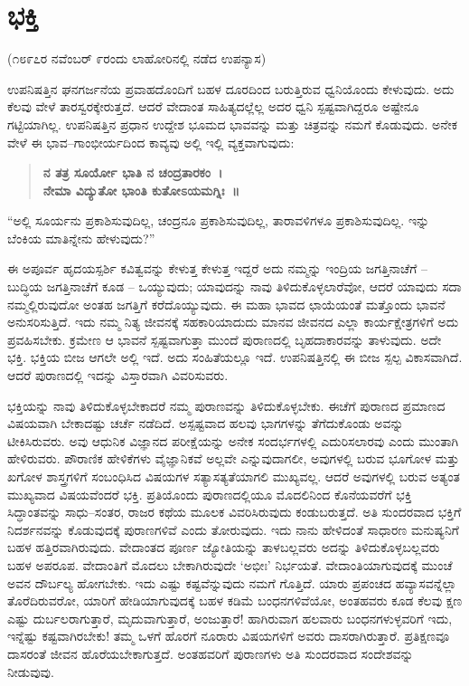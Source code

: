 
\chapter{ಭಕ್ತಿ}

\begin{center}
(೧೮೯೭ರ ನವೆಂಬರ್​ ೯ರಂದು ಲಾಹೋರಿನಲ್ಲಿ ನಡೆದ ಉಪನ್ಯಾಸ)
\end{center}

ಉಪನಿಷತ್ತಿನ ಘನಗರ್ಜನೆಯ ಪ್ರವಾಹದೊಂದಿಗೆ ಬಹಳ ದೂರದಿಂದ ಬರುತ್ತಿರುವ ಧ್ವನಿಯೊಂದು ಕೇಳುವುದು. ಅದು ಕೆಲವು ವೇಳೆ ತಾರಸ್ವರಕ್ಕೇರುತ್ತದೆ. ಆದರೆ ವೇದಾಂತ ಸಾಹಿತ್ಯದಲ್ಲೆಲ್ಲ ಅದರ ಧ್ವನಿ ಸ್ಪಷ್ಟವಾಗಿದ್ದರೂ ಅಷ್ಟೇನೂ ಗಟ್ಟಿಯಾಗಿಲ್ಲ. ಉಪನಿಷತ್ತಿನ ಪ್ರಧಾನ ಉದ್ದೇಶ ಭೂಮದ ಭಾವವನ್ನು ಮತ್ತು ಚಿತ್ರವನ್ನು ನಮಗೆ ಕೊಡುವುದು. ಅನೇಕ ವೇಳೆ ಈ ಭಾವ–ಗಾಂಭೀರ್ಯದಿಂದ ಕಾವ್ಯವು ಅಲ್ಲಿ ಇಲ್ಲಿ ವ್ಯಕ್ತವಾಗುವುದು:

\begin{verse}
\textbf{ನ ತತ್ರ ಸೂರ್ಯೋ ಭಾತಿ ನ ಚಂದ್ರತಾರಕಂ~।}\\\textbf{ನೇಮಾ ವಿದ್ಯುತೋ ಭಾಂತಿ ಕುತೋಽಯಮಗ್ನಿಃ~॥}
\end{verse}

“ಅಲ್ಲಿ ಸೂರ್ಯನು ಪ್ರಕಾಶಿಸುವುದಿಲ್ಲ, ಚಂದ್ರನೂ ಪ್ರಕಾಶಿಸುವುದಿಲ್ಲ, ತಾರಾವಳಿಗಳೂ ಪ್ರಕಾಶಿಸುವುದಿಲ್ಲ. ಇನ್ನು ಬೆಂಕಿಯ ಮಾತಿನ್ನೇನು ಹೇಳುವುದು?”

ಈ ಅಪೂರ್ವ ಹೃದಯಸ್ಪರ್ಶಿ ಕವಿತ್ವವನ್ನು ಕೇಳುತ್ತ ಕೇಳುತ್ತ ಇದ್ದರೆ ಅದು ನಮ್ಮನ್ನು ಇಂದ್ರಿಯ ಜಗತ್ತಿನಾಚೆಗೆ – ಬುದ್ಧಿಯ ಜಗತ್ತಿನಾಚೆಗೆ ಕೂಡ – ಒಯ್ಯುವುದು; ಯಾವುದನ್ನು ನಾವು ತಿಳಿದುಕೊಳ್ಳಲಾರೆವೋ, ಆದರೆ ಯಾವುದು ಸದಾ ನಮ್ಮಲ್ಲಿರುವುದೋ ಅಂತಹ ಜಗತ್ತಿಗೆ ಕರೆದೊಯ್ಯುವುದು. ಈ ಮಹಾ ಭಾವದ ಛಾಯೆಯಂತೆ ಮತ್ತೊಂದು ಭಾವನೆ ಅನುಸರಿಸುತ್ತಿದೆ. ಇದು ನಮ್ಮ ನಿತ್ಯ ಜೀವನಕ್ಕೆ ಸಹಕಾರಿಯಾದುದು ಮಾನವ ಜೀವನದ ಎಲ್ಲಾ ಕಾರ್ಯಕ್ಷೇತ್ರಗಳಿಗೆ ಅದು ಪ್ರವಹಿಸಬೇಕು. ಕ್ರಮೇಣ ಆ ಭಾವನೆ ಸ್ಪಷ್ಟವಾಗುತ್ತಾ ಮುಂದೆ ಪುರಾಣದಲ್ಲಿ ಬೃಹದಾಕಾರವನ್ನು ತಾಳುವುದು. ಅದೇ ಭಕ್ತಿ. ಭಕ್ತಿಯ ಬೀಜ ಆಗಲೇ ಅಲ್ಲಿ ಇದೆ. ಅದು ಸಂಹಿತೆಯಲ್ಲೂ ಇದೆ. ಉಪನಿಷತ್ತಿನಲ್ಲಿ ಈ ಬೀಜ ಸ್ಪಲ್ಪ ವಿಕಾಸವಾಗಿದೆ. ಆದರೆ ಪುರಾಣದಲ್ಲಿ ಇದನ್ನು ವಿಸ್ತಾರವಾಗಿ ವಿವರಿಸುವರು.

ಭಕ್ತಿಯನ್ನು ನಾವು ತಿಳಿದುಕೊಳ್ಳಬೇಕಾದರೆ ನಮ್ಮ ಪುರಾಣವನ್ನು ತಿಳಿದುಕೊಳ್ಳಬೇಕು. ಈಚೆಗೆ ಪುರಾಣದ ಪ್ರಮಾಣದ ವಿಷಯವಾಗಿ ಬೇಕಾದಷ್ಟು ಚರ್ಚೆ ನಡೆದಿದೆ. ಅಸ್ಪಷ್ಟವಾದ ಹಲವು ಭಾಗಗಳನ್ನು ತೆಗೆದುಕೊಂಡು ಅವನ್ನು ಟೀಕಿಸಿರುವರು. ಅವು ಆಧುನಿಕ ವಿಜ್ಞಾನದ ಪರೀಕ್ಷೆಯನ್ನು ಅನೇಕ ಸಂದರ್ಭಗಳಲ್ಲಿ ಎದುರಿಸಲಾರವು ಎಂದು ಮುಂತಾಗಿ ಹೇಳಿರುವರು. ಪೌರಾಣಿಕ ಹೇಳಿಕೆಗಳು ವೈಜ್ಞಾನಿಕವೆ ಅಲ್ಲವೇ ಎನ್ನುವುದಾಗಲೀ, ಅವುಗಳಲ್ಲಿ ಬರುವ ಭೂಗೋಳ ಮತ್ತು ಖಗೋಳ ಶಾಸ್ತ್ರಗಳಿಗೆ ಸಂಬಂಧಿಸಿದ ವಿಷಯಗಳ ಸತ್ಯಾಸತ್ಯತೆಯಾಗಲಿ ಮುಖ್ಯವಲ್ಲ. ಆದರೆ ಅವುಗಳಲ್ಲಿ ಬರುವ ಅತ್ಯಂತ ಮುಖ್ಯವಾದ ವಿಷಯವೆಂದರೆ ಭಕ್ತಿ. ಪ್ರತಿಯೊಂದು ಪುರಾಣದಲ್ಲಿಯೂ ಮೊದಲಿನಿಂದ ಕೊನೆಯವರೆಗೆ ಭಕ್ತಿ ಸಿದ್ಧಾಂತವನ್ನು ಸಾಧು–ಸಂತರ, ರಾಜರ ಕಥೆಯ ಮೂಲಕ ವಿವರಿಸಿರುವುದು ಕಂಡುಬರುತ್ತದೆ. ಅತಿ ಸುಂದರವಾದ ಭಕ್ತಿಗೆ ನಿದರ್ಶನವನ್ನು ಕೊಡುವುದಕ್ಕೆ ಪುರಾಣಗಳಿವೆ ಎಂದು ತೋರುವುದು. ಇದು ನಾನು ಹೇಳಿದಂತೆ ಸಾಧಾರಣ ಮನುಷ್ಯನಿಗೆ ಬಹಳ ಹತ್ತಿರವಾಗಿರುವುದು. ವೇದಾಂತದ ಪೂರ್ಣ ಜ್ಯೋತಿಯನ್ನು ತಾಳಬಲ್ಲವರು ಅದನ್ನು ತಿಳಿದುಕೊಳ್ಳಬಲ್ಲವರು ಬಹಳ ಅಪರೂಪ. ವೇದಾಂತಿಗೆ ಮೊದಲು ಬೇಕಾಗಿರುವುದೇ ‘ಅಭೀಃ’ ನಿರ್ಭಯತೆ. ವೇದಾಂತಿಯಾಗುವುದಕ್ಕೆ ಮುಂಚೆ ಅವನ ದೌರ್ಬಲ್ಯ ಹೋಗಬೇಕು. ಇದು ಎಷ್ಟು ಕಷ್ಟವೆನ್ನುವುದು ನಮಗೆ ಗೊತ್ತಿದೆ. ಯಾರು ಪ್ರಪಂಚದ ಹವ್ಯಾಸವನ್ನೆಲ್ಲಾ ತೊರೆದಿರುವರೋ, ಯಾರಿಗೆ ಹೇಡಿಯಾಗುವುದಕ್ಕೆ ಬಹಳ ಕಡಿಮೆ ಬಂಧನಗಳಿವೆಯೋ, ಅಂತಹವರು ಕೂಡ ಕೆಲವು ಕ್ಷಣ ಎಷ್ಟು ದುರ್ಬಲರಾಗುತ್ತಾರೆ, ಮೃದುವಾಗುತ್ತಾರೆ, ಅಂಜುತ್ತಾರೆ! ಹಾಗಿರುವಾಗ ಹಲವಾರು ಬಂಧನಗಳುಳ್ಳವರಿಗೆ ಇದು, ಇನ್ನೆಷ್ಟು ಕಷ್ಟವಾಗಿರಬೇಕು! ತಮ್ಮ ಒಳಗೆ ಹೊರಗೆ ನೂರಾರು ವಿಷಯಗಳಿಗೆ ಅವರು ದಾಸರಾಗಿರುತ್ತಾರೆ. ಪ್ರತಿಕ್ಷಣವೂ ದಾಸರಂತೆ ಜೀವನ ಹೊರೆಯಬೇಕಾಗುತ್ತದೆ. ಅಂತಹವರಿಗೆ ಪುರಾಣಗಳು ಅತಿ ಸುಂದರವಾದ ಸಂದೇಶವನ್ನು ನೀಡುವುವು.


